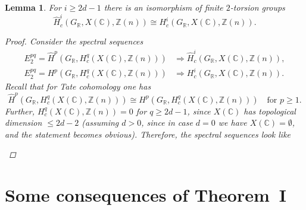 \documentclass[leqno,12pt]{article}
\theoremstyle{plain}
\newtheorem{lemma}[theorem]{\indent\sc Lemma}
\theoremstyle{definition}
\newcommand{\ZZ}{\mathbb{Z}}
\newcommand{\RR}{\mathbb{R}}
\newcommand{\CC}{\mathbb{C}}
\begin{document}
\begin{lemma}
  \label{lemma:Tate-vs-normal-cohomology-of-X(C)}
  For $i \ge 2d - 1$ there is an isomorphism of finite $2$-torsion groups
  \[ \widehat{H}^i_c (G_\RR, X (\CC), \ZZ(n)) \cong
    H^i_c (G_\RR, X (\CC), \ZZ(n)). \]

  \begin{proof}
    Consider the spectral sequences
    \begin{align*}
      E^{pq}_2 = \widehat{H}^p (G_\RR, H^q_c (X (\CC), \ZZ(n))) & \Longrightarrow
      \widehat{H}^i_c (G_\RR, X (\CC), \ZZ(n)), \\
      E^{pq}_2 = H^p (G_\RR, H^q_c (X (\CC), \ZZ(n))) & \Longrightarrow
      H^i_c (G_\RR, X (\CC), \ZZ(n)).
    \end{align*}
    Recall that for Tate cohomology one has
    \[ \widehat{H}^p (G_\RR, H^q_c (X (\CC), \ZZ(n))) \cong
      H^p (G_\RR, H^q_c (X (\CC), \ZZ(n)))
      \quad\text{for }p \ge 1. \]
    Further, $H^q_c (X (\CC), \ZZ(n)) = 0$
    for $q \ge 2d-1$, since $X (\CC)$ has topological dimension $\le 2d - 2$
    (assuming $d > 0$, since in case $d = 0$ we have $X (\CC) = \emptyset$, and
    the statement becomes obvious).  Therefore, the spectral sequences look like
    \begin{center}
    \end{center}
  \end{proof}
\end{lemma}


\section{Some consequences of Theorem~I}
\label{sec:consequences-of-theorem-I}
\end{document}
